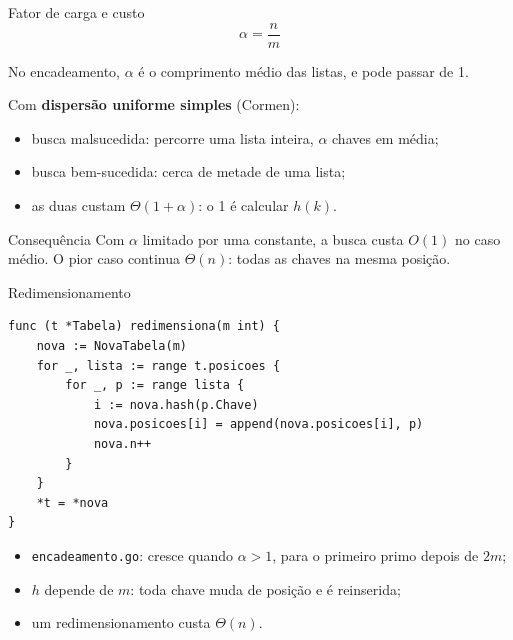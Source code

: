 \documentclass{beamer}
\begin{document}
\begin{frame}{Fator de carga e custo}
	\[
		\alpha = \frac{n}{m}
	\]

	\vspace{0.1cm}
	No encadeamento, $\alpha$ é o comprimento médio das listas, e pode passar de 1.

	\vspace{0.3cm}
	Com \textbf{dispersão uniforme simples} (Cormen):
	\begin{itemize}
		\item busca malsucedida: percorre uma lista inteira, $\alpha$ chaves em
		      média;
		\item busca bem-sucedida: cerca de metade de uma lista;
		\item as duas custam $\Theta(1 + \alpha)$: o 1 é calcular $h(k)$.
	\end{itemize}

	\vspace{0.3cm}
	\begin{block}{Consequência}
		Com $\alpha$ limitado por uma constante, a busca custa $O(1)$ no caso
		médio. O pior caso continua $\Theta(n)$: todas as chaves na mesma posição.
	\end{block}
\end{frame}

\begin{frame}[fragile]{Redimensionamento}
	\begin{verbatim}
func (t *Tabela) redimensiona(m int) {
	nova := NovaTabela(m)
	for _, lista := range t.posicoes {
		for _, p := range lista {
			i := nova.hash(p.Chave)
			nova.posicoes[i] = append(nova.posicoes[i], p)
			nova.n++
		}
	}
	*t = *nova
}
\end{verbatim}

	\begin{itemize}
		\item \texttt{encadeamento.go}: cresce quando $\alpha > 1$, para o primeiro
		      primo depois de $2m$;
		\item $h$ depende de $m$: toda chave muda de posição e é reinserida;
		\item um redimensionamento custa $\Theta(n)$.
	\end{itemize}
\end{frame}
\end{document}
